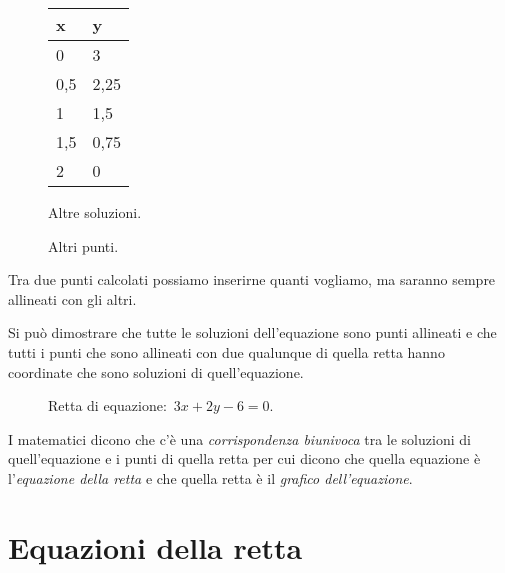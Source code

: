 \begin{inaccessibleblock}
 \begin{figure}[h]
 \centering
 \begin{minipage}[]{.50\textwidth}
  \begin{center}
   \begin{tabular}{l|l}
    x   & y \\
    \hline
    0   & 3    \\
    0,5 & 2,25 \\
    1   & 1,5  \\
    1,5 & 0,75 \\
    2   & 0
   \end{tabular}
  \end{center}
  \caption{Altre soluzioni.}\label{fig:altresoluzioni}
 \end{minipage}
 \begin{minipage}[]{.40\textwidth}
  \centering
  \caption{Altri punti.}\label{fig:ingrandimento}
 \end{minipage}
\end{figure}
\end{inaccessibleblock}

Tra due punti calcolati possiamo inserirne quanti vogliamo, ma saranno sempre 
allineati con gli altri.

Si può dimostrare che tutte le soluzioni dell'equazione sono punti allineati 
e che tutti i punti che sono allineati con due qualunque di quella retta hanno
coordinate che sono soluzioni di quell'equazione. 

\begin{inaccessibleblock}
 \begin{figure}[h]
 \centering
 \caption{Retta di equazione:~\(3x + 2y - 6 = 0\).}\label{fig:retta01}
\end{figure}
\end{inaccessibleblock}

I matematici dicono che c'è una \emph{corrispondenza biunivoca} tra le 
soluzioni di quell'equazione e i punti di quella retta per cui dicono che 
quella equazione è l'\emph{equazione della retta} e che quella retta è il 
\emph{grafico dell'equazione}.

\section{Equazioni della retta}
\label{sec:retta_equazioni}


